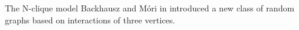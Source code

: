 \begin{block}{The N-clique model}
Backhausz and Móri in \cite{BM} introduced a new class of random graphs based on interactions of three vertices.
\end{block}
